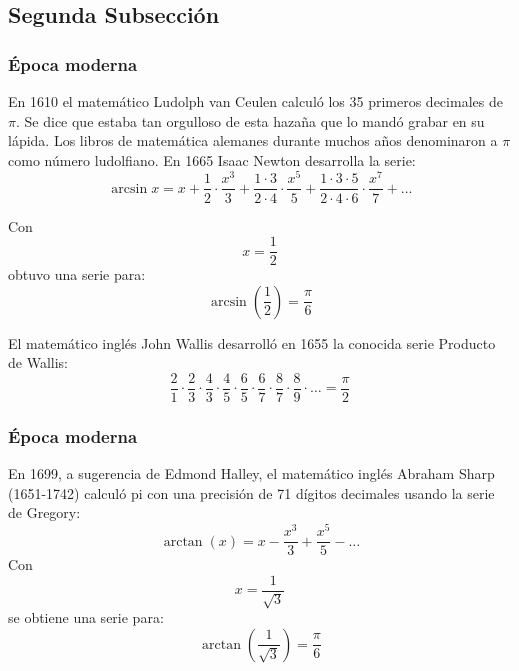 \documentclass{beamer}
\begin{document}
\subsection{Segunda Subsección}
\begin{frame}
\frametitle{Época moderna}
En 1610 el matemático Ludolph van Ceulen calculó los 35 primeros decimales de $\pi$. Se dice que estaba tan orgulloso de esta hazaña que lo mandó grabar en su lápida. Los libros de matemática alemanes durante muchos años denominaron a $\pi$ como número ludolfiano. En 1665 Isaac Newton desarrolla la serie:
  \begin{displaymath}  
   \arcsin {x} = x + \frac{1}{2} \cdot \frac {x^3}{3} + \frac{1 \cdot 3}{2\cdot 4} \cdot \frac {x^5}{5} + \frac{1\cdot 3\cdot 5}{2\cdot 4\cdot 6} \cdot \frac{x^7}{7} + \ldots
  \end{displaymath}
    

Con \begin{displaymath} x = \frac {1} {2}\end{displaymath}
  obtuvo una serie para:
  \begin{displaymath}  
  \arcsin \left(\frac{1}{2}\right) = \frac{\pi}{6}
  \end{displaymath}
   

El matemático inglés John Wallis desarrolló en 1655 la conocida serie Producto de Wallis:
\begin{displaymath}  
    \frac{2}{1} \cdot \frac{2}{3} \cdot \frac{4}{3} \cdot \frac{4}{5} \cdot \frac{6}{5} \cdot \frac{6}{7} \cdot \frac{8}{7} \cdot \frac{8}{9} \cdot \dots = \frac{\pi}{2} 
\end{displaymath}

\end{frame}
\begin{frame}
\frametitle{Época moderna}

En 1699, a sugerencia de Edmond Halley, el matemático inglés Abraham Sharp (1651-1742) calculó pi con una precisión de 71 dígitos decimales usando la serie de Gregory:
\begin{displaymath} 
    \arctan (x) = x - \frac {x^3} {3} + \frac {x^5} {5} - \ldots
\end{displaymath}
Con \begin{displaymath} x = \frac {1} {\sqrt{3}}\end{displaymath} se obtiene una serie para:
\begin{displaymath} 
    \arctan \left ( \frac{1}{\sqrt{3}} \right ) = \frac{\pi}{6}
\end{displaymath}

\end{frame}
\end{document}
